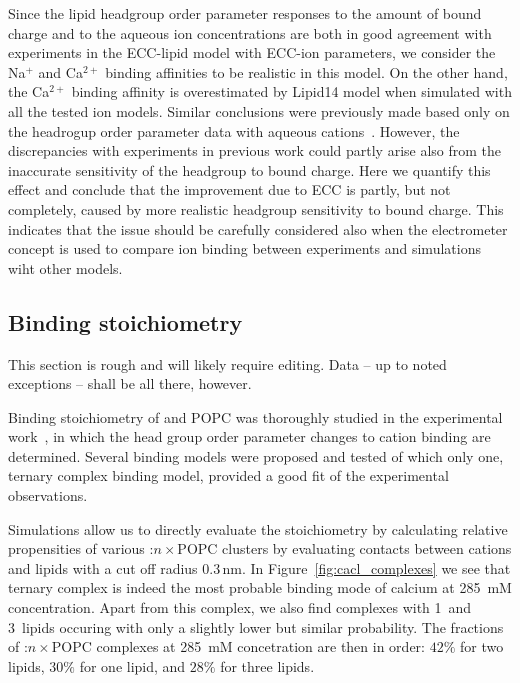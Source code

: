 \documentclass[aip,jcp,twocolumn]{revtex4}
\begin{document}
Since the lipid headgroup order parameter responses to the amount of bound charge
and to the aqueous ion concentrations are both in good agreement with experiments
in the ECC-lipid model with ECC-ion parameters, we consider the Na$^+$ and Ca$^{2+}$
binding affinities to be realistic in this model. On the other hand, the Ca$^{2+}$
binding affinity is overestimated by Lipid14 model when simulated with all the
tested ion models. Similar conclusions were previously made based only on the headrogup
order parameter data with aqueous cations~\cite{catte16}. However,
the discrepancies with experiments in previous work could partly arise also from
the inaccurate sensitivity of the headgroup to bound charge. Here we quantify this
effect and conclude that the improvement due to ECC is partly, but not completely,
caused by more realistic headgroup sensitivity to bound charge.
This indicates that the issue should be carefully considered also when
the electrometer concept is used to compare ion binding between experiments
and simulations wiht other models.





\subsection{Binding stoichiometry}


This section is rough and will likely require editing. 
Data -- up to noted exceptions -- shall be all there, however. 

Binding stoichiometry of  and POPC was 
thoroughly studied in the experimental work~\cite{altenbach84},
in which the head group order parameter changes to cation binding are determined.
Several binding models were proposed and tested of which only one,
ternary complex binding model, provided a good fit of the experimental observations. 

Simulations allow us to directly evaluate the stoichiometry 
by calculating relative propensities of various :$n\times$POPC clusters
by evaluating contacts between cations and lipids with a cut off radius $0.3\,\mathrm{nm}$. 
In Figure~\ref{fig:cacl_complexes} we see that ternary complex is indeed 
the most probable binding mode of calcium at 285~mM concentration. 
Apart from this complex, we also find complexes with 1~and 3~lipids
occuring with only a slightly lower but similar probability.
The fractions of :$n\times$POPC complexes at 285~mM concetration 
are then in order:
$42\%$ for two lipids,
$30\%$ for one lipid, and
$28\%$ for three lipids.
\end{document}
